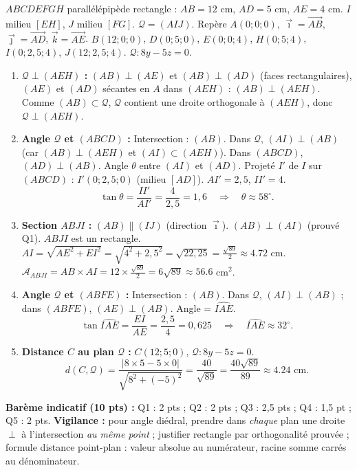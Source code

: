 \documentclass[11pt]{article}
\newcommand{\cle}[1]{{\popxbold\color{popdark}#1}}
\begin{document}
\begin{corrige}
$ABCDEFGH$ parallélépipède rectangle : $AB=12$ cm, $AD=5$ cm, $AE=4$ cm. $I$ milieu $[EH]$, $J$ milieu $[FG]$. $\mathcal{Q}=(AIJ)$. Repère $A(0;0;0)$, $\vec{\imath}=\overrightarrow{AB}$, $\vec{\jmath}=\overrightarrow{AD}$, $\vec{k}=\overrightarrow{AE}$.
$B(12;0;0)$, $D(0;5;0)$, $E(0;0;4)$, $H(0;5;4)$, $I(0;2,5;4)$, $J(12;2,5;4)$. $\mathcal{Q} : 8y-5z=0$.
\begin{enumerate}
\item \textbf{$\mathcal{Q}\perp(AEH)$ :} $(AB)\perp(AE)$ et $(AB)\perp(AD)$ (faces rectangulaires), $(AE)$ et $(AD)$ sécantes en $A$ dans $(AEH)$ : $(AB)\perp(AEH)$. Comme $(AB)\subset\mathcal{Q}$, $\mathcal{Q}$ contient une droite orthogonale à $(AEH)$, donc $\mathcal{Q}\perp(AEH)$.
\item \textbf{Angle $\mathcal{Q}$ et $(ABCD)$ :} Intersection : $(AB)$. Dans $\mathcal{Q}$, $(AI)\perp(AB)$ (car $(AB)\perp(AEH)$ et $(AI)\subset(AEH)$). Dans $(ABCD)$, $(AD)\perp(AB)$. Angle $\theta$ entre $(AI)$ et $(AD)$. Projeté $I'$ de $I$ sur $(ABCD)$ : $I'(0;2,5;0)$ (milieu $[AD]$). $AI'=2,5$, $II'=4$.
\[ \tan\theta = \frac{II'}{AI'} = \frac{4}{2,5} = 1,6 \quad\Rightarrow\quad \theta \approx 58^\circ. \]
\item \textbf{Section $ABJI$ :} $(AB)\parallel(IJ)$ (direction $\vec{\imath}$). $(AB)\perp(AI)$ (prouvé Q1). $ABJI$ est un \cle{rectangle}.
$AI = \sqrt{AE^2+EI^2} = \sqrt{4^2+2,5^2} = \sqrt{22,25} = \frac{\sqrt{89}}{2} \approx \num{4,72}$ cm.
$\mathcal{A}_{ABJI} = AB\times AI = 12\times\frac{\sqrt{89}}{2} = 6\sqrt{89} \approx \num{56,6}$ cm$^2$.
\item \textbf{Angle $\mathcal{Q}$ et $(ABFE)$ :} Intersection : $(AB)$. Dans $\mathcal{Q}$, $(AI)\perp(AB)$ ; dans $(ABFE)$, $(AE)\perp(AB)$. Angle = $\widehat{IAE}$.
\[ \tan\widehat{IAE} = \frac{EI}{AE} = \frac{2,5}{4} = 0,625 \quad\Rightarrow\quad \widehat{IAE} \approx 32^\circ. \]
\item \textbf{Distance $C$ au plan $\mathcal{Q}$ :} $C(12;5;0)$, $\mathcal{Q}: 8y-5z=0$.
\[ d(C,\mathcal{Q}) = \frac{|8\times 5 - 5\times 0|}{\sqrt{8^2+(-5)^2}} = \frac{40}{\sqrt{89}} = \frac{40\sqrt{89}}{89} \approx \num{4,24} \text{ cm}. \]
\end{enumerate}
\textbf{Barème indicatif (10 pts) :} Q1 : 2 pts ; Q2 : 2 pts ; Q3 : 2,5 pts ; Q4 : 1,5 pt ; Q5 : 2 pts.
\textbf{Vigilance :} pour angle diédral, prendre dans \emph{chaque} plan une droite $\perp$ à l'intersection \emph{au même point} ; justifier rectangle par orthogonalité prouvée ; formule distance point-plan : valeur absolue au numérateur, racine somme carrés au dénominateur.
\end{corrige}
\end{document}
